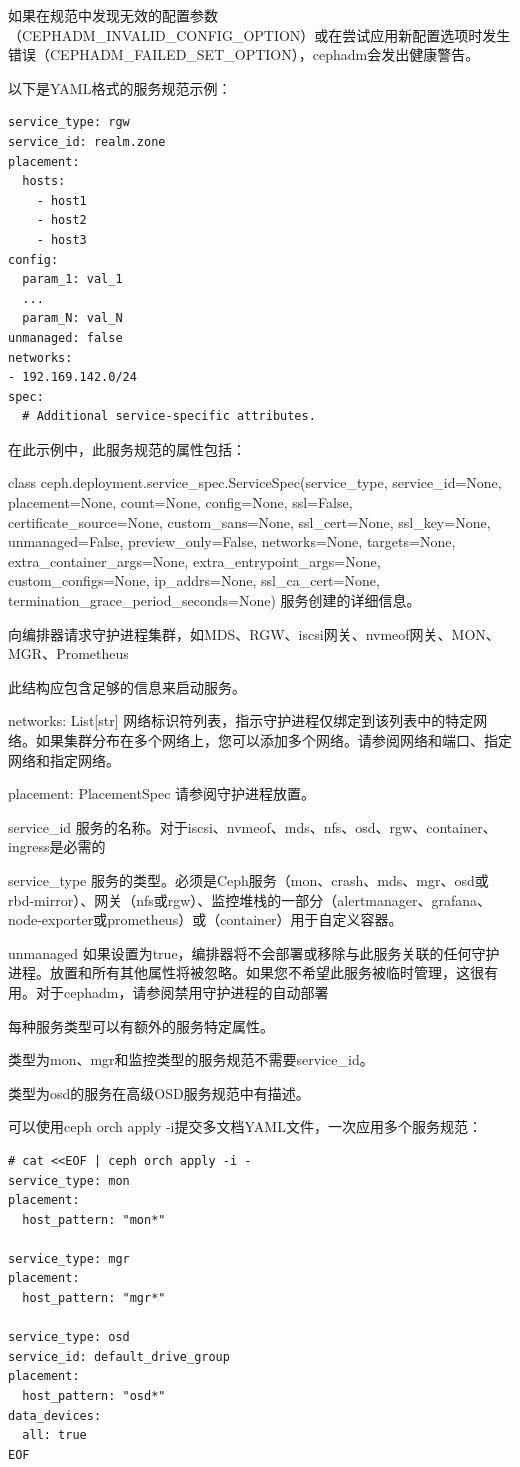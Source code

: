 \documentclass[12pt,UTF8]{ctexbook}
\begin{document}
如果在规范中发现无效的配置参数（CEPHADM_INVALID_CONFIG_OPTION）或在尝试应用新配置选项时发生错误（CEPHADM_FAILED_SET_OPTION），cephadm会发出健康警告。

以下是YAML格式的服务规范示例：
\begin{verbatim}
service_type: rgw
service_id: realm.zone
placement:
  hosts:
    - host1
    - host2
    - host3
config:
  param_1: val_1
  ...
  param_N: val_N
unmanaged: false
networks:
- 192.169.142.0/24
spec:
  # Additional service-specific attributes.
\end{verbatim}

在此示例中，此服务规范的属性包括：

class ceph.deployment.service_spec.ServiceSpec(service_type, service_id=None, placement=None, count=None, config=None, ssl=False, certificate_source=None, custom_sans=None, ssl_cert=None, ssl_key=None, unmanaged=False, preview_only=False, networks=None, targets=None, extra_container_args=None, extra_entrypoint_args=None, custom_configs=None, ip_addrs=None, ssl_ca_cert=None, termination_grace_period_seconds=None)\n
服务创建的详细信息。

向编排器请求守护进程集群，如MDS、RGW、iscsi网关、nvmeof网关、MON、MGR、Prometheus

此结构应包含足够的信息来启动服务。

networks: List[str]\n
网络标识符列表，指示守护进程仅绑定到该列表中的特定网络。如果集群分布在多个网络上，您可以添加多个网络。请参阅网络和端口、指定网络和指定网络。

placement: PlacementSpec\n
请参阅守护进程放置。

service_id\n
服务的名称。对于iscsi、nvmeof、mds、nfs、osd、rgw、container、ingress是必需的

service_type\n
服务的类型。必须是Ceph服务（mon、crash、mds、mgr、osd或rbd-mirror）、网关（nfs或rgw）、监控堆栈的一部分（alertmanager、grafana、node-exporter或prometheus）或（container）用于自定义容器。

unmanaged\n
如果设置为true，编排器将不会部署或移除与此服务关联的任何守护进程。放置和所有其他属性将被忽略。如果您不希望此服务被临时管理，这很有用。对于cephadm，请参阅禁用守护进程的自动部署

每种服务类型可以有额外的服务特定属性。

类型为mon、mgr和监控类型的服务规范不需要service_id。

类型为osd的服务在高级OSD服务规范中有描述。

可以使用ceph orch apply -i提交多文档YAML文件，一次应用多个服务规范：
\begin{verbatim}
# cat <<EOF | ceph orch apply -i -
service_type: mon
placement:
  host_pattern: "mon*"

service_type: mgr
placement:
  host_pattern: "mgr*"

service_type: osd
service_id: default_drive_group
placement:
  host_pattern: "osd*"
data_devices:
  all: true
EOF
\end{verbatim}
\end{document}

